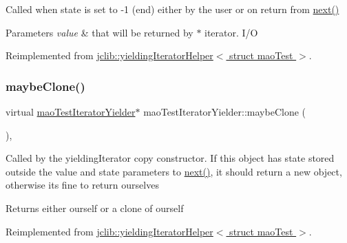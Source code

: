 Called when state is set to -\/1 (end) either by the user or on return from \hyperlink{classmaoTestIteratorYielder_a88aff5d153ff1dfdd54710706da7eeec}{next()} 
\begin{DoxyParams}{Parameters}
{\em value} & that will be returned by $\ast$ iterator. I/O \\
\hline
\end{DoxyParams}


Reimplemented from \hyperlink{classjclib_1_1yieldingIteratorHelper_a62f77cf3f5376e5997512907460f2d36}{jclib\+::yielding\+Iterator\+Helper$<$ struct mao\+Test $>$}.

\mbox{\label{classmaoTestIteratorYielder_a1ecc09d34a4b6924317eb42c7fb652ac}} 
\subsubsection{\texorpdfstring{maybe\+Clone()}{maybeClone()}}
{\footnotesize\ttfamily virtual \hyperlink{classmaoTestIteratorYielder}{mao\+Test\+Iterator\+Yielder}$\ast$ mao\+Test\+Iterator\+Yielder\+::maybe\+Clone (\begin{DoxyParamCaption}{ }\end{DoxyParamCaption})\hspace{0.3cm}{\ttfamily [inline]}, {\ttfamily [virtual]}}

Called by the yielding\+Iterator copy constructor. If this object has state stored outside the value and state parameters to \hyperlink{classmaoTestIteratorYielder_a88aff5d153ff1dfdd54710706da7eeec}{next()}, it should return a new object, otherwise it\textquotesingle{}s fine to return ourselves \begin{DoxyReturn}{Returns}
either ourself or a clone of ourself 
\end{DoxyReturn}


Reimplemented from \hyperlink{classjclib_1_1yieldingIteratorHelper_ad3127265c429c4ac282964b7a3b261be}{jclib\+::yielding\+Iterator\+Helper$<$ struct mao\+Test $>$}.

\mbox{\label{classmaoTestIteratorYielder_a88aff5d153ff1dfdd54710706da7eeec}} 
